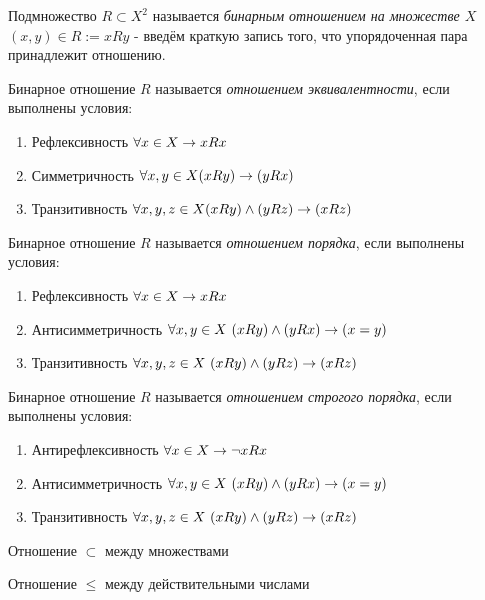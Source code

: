 \begin{definition}
    Подмножество $R \subset X^2$ называется \textit{бинарным отношением на множестве $X$} \\
    $(x, y) \in R := xRy$ - введём краткую запись того, что упорядоченная пара принадлежит отношению.
\end{definition}

\begin{definition}
    Бинарное отношение $R$ называется \textit{отношением эквивалентности}, если выполнены условия:
    \begin{enumerate}
        \item Рефлексивность $\forall x \in X \rightarrow xRx$
        \item Симметричность $\forall x, y \in X (xRy) \rightarrow (yRx)$
        \item Транзитивность $\forall x, y, z \in X (xRy) \wedge (yRz) \rightarrow (xRz)$
    \end{enumerate}
\end{definition}

\begin{definition}
    Бинарное отношение $R$ называется \textit{отношением порядка}, если выполнены условия:
    \begin{enumerate}
        \item Рефлексивность $\forall x \in X \rightarrow xRx$
        \item Антисимметричность $\forall x, y \in X\ (xRy) \wedge (yRx) \ra (x = y)$
        \item Транзитивность
        $\forall x, y, z \in X\ (xRy) \wedge (yRz) \ra (xRz)$
    \end{enumerate}
\end{definition}

\begin{adefinition}
    Бинарное отношение $R$ называется \textit{отношением строгого порядка}, если выполнены условия:
    \begin{enumerate}
        \item Антирефлексивность $\forall x \in X \rightarrow \neg xRx$
        \item Антисимметричность $\forall x, y \in X\ (xRy) \wedge (yRx) \ra (x = y)$
        \item Транзитивность
        $\forall x, y, z \in X\ (xRy) \wedge (yRz) \ra (xRz)$
    \end{enumerate}
\end{adefinition}

\begin{example}
    Отношение $\subset$ между множествами
\end{example}
\begin{example}
    Отношение $\le$ между действительными числами
\end{example}

